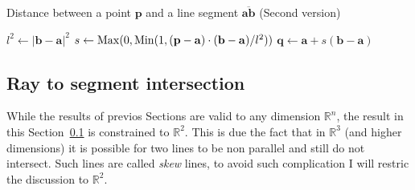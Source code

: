 {\centering
\begin{minipage}{\linewidth}
  \begin{algorithm}[H]
    \caption{Distance between a point $\mathbf{p}$ and a line segment $\overline{\mathbf{a}\mathbf{b}}$  (Second version)}
    \label{alg:poin2seg2}
    \begin{algorithmic}[1] %
       
        \State $l^2 \gets |\mathbf{b} - \mathbf{a}|^2$
         
          \State {}
        \EndIf
        \State $s \gets \operatorname{Max}(0, \operatorname{Min}(1, (\mathbf{p}-\mathbf{a})\cdot(\mathbf{b}-\mathbf{a}) / l^2))$ 
        \State $\mathbf{q} \gets \mathbf{a} + s (\mathbf{b} - \mathbf{a})$
        \State {}
      \EndProcedure
    \end{algorithmic}
  \end{algorithm}
\end{minipage}
\par
}

{\centering
\begin{minipage}{\linewidth}
\end{minipage}
\par
}

\subsection{Ray to segment intersection}
\label{sec:ray2segment}
While the results of previos Sections are valid to any dimension $\mathbb{R}^n$, the result in this Section~\ref{sec:ray2segment} is constrained to $\mathbb{R}^2$.
This is due the fact that in $\mathbb{R}^3$ (and higher dimensions) it is possible for two lines to be non parallel and still do not intersect.
Such lines are called \emph{skew} lines, to avoid such complication I will restric the discussion to $\mathbb{R}^2$.

